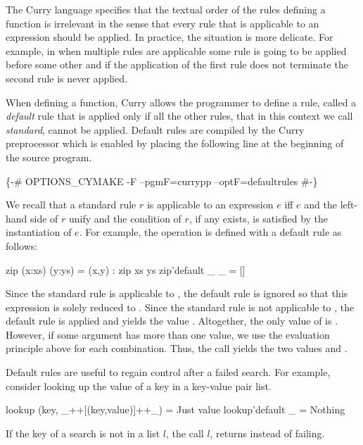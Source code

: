 The Curry language specifies that the textual order of the rules
defining a function is irrelevant in the sense that every rule that is
applicable to an expression should be applied.
In practice, the situation is more delicate.
For example, in \pakcs{} when multiple rules are applicable
some rule is going to be applied before some other
and if the application of the first rule
does not terminate the second rule is never applied.

When defining a function,
Curry allows the programmer to define a rule, called
a \emph{default} rule 
that is applied only if all the other rules,
that in this context we call \emph{standard}, cannot be applied.
Default rules are compiled by the Curry preprocessor
which is enabled by placing the following
line at the beginning of the source program.
%
\begin{prog}
\{-\# OPTIONS_CYMAKE -F --pgmF=currypp --optF=defaultrules \#-\}  
\end{prog}
%
We recall that a standard rule $r$ is applicable to an expression
$e$ iff $e$ and the left-hand side of $r$ unify and the condition
of $r$, if any exists, is satisfied by the instantiation of $e$.
For example, the operation 
is defined with a default rule as follows:
%
\begin{prog}
zip (x:xs) (y:ys) = (x,y) : zip xs ys
zip'default _ _ = []
\end{prog}
%
Since the standard rule is applicable to , the
default rule is ignored so that this expression is solely reduced to
. Since the standard rule is not applicable to
, the default rule is applied and yields the value \code{[]}.
Altogether, the only value of  is \code{[(1,2)]}.
However, if
some argument has more than one value, we use the evaluation principle
above for each combination.  Thus, the call  yields
the two values \code{[(1,2)]} and \code{[]}.

Default rules are useful to regain control after a failed search.  For
example, consider looking up the value of a key in a key-value pair list.
%
\begin{prog}
  lookup (key, \_++[(key,value)]++\_) = Just value
  lookup'default _ = Nothing
\end{prog}
%
If the key of a search is not in a list $l$, the call
 $l$, returns  instead of failing.

